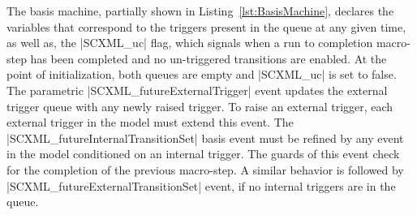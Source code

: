 The basis machine, partially shown in Listing~\ref{lst:BasisMachine}, declares the variables that correspond to the triggers present in the queue at any given time, as well as, the |SCXML_uc| flag, which signals when a run to completion macro-step has been completed and no un-triggered transitions are enabled. 
At the point of initialization, both queues are empty and |SCXML_uc| is set to false. 
The parametric |SCXML_futureExternalTrigger| event updates the external trigger queue with any newly raised trigger. 
To raise an external trigger, each external trigger in the model must extend this event.   
The |SCXML_futureInternalTransitionSet| basis event must be refined by any event in the model conditioned on an internal trigger. 
The guards of this event check for the completion of the previous macro-step. 
A similar behavior is followed by |SCXML_futureExternalTransitionSet| event, if no internal triggers are in the queue.  

